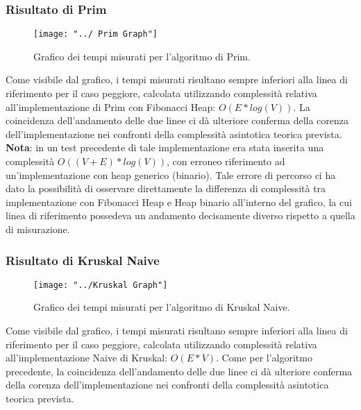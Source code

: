 \subsubsection{Risultato di Prim}
\begin{figure}[H]
	\centering
	\texttt{[image: "../ Prim Graph"]}
	\caption[]{Grafico dei tempi misurati per l'algoritmo di Prim.}
	\label{fig:prim-graph}
\end{figure}
Come visibile dal grafico, i tempi misurati risultano sempre inferiori alla linea di riferimento per il caso peggiore, calcolata utilizzando complessità relativa all'implementazione di Prim con Fibonacci Heap: $O(E*log(V))$. La coincidenza dell'andamento delle due linee ci dà ulteriore conferma della corenza dell'implementazione nei confronti della complessità asintotica teorica prevista. \\

\textbf{Nota}: in un test precedente di tale implementazione era stata inserita una complessità $O((V + E)*log(V))$, con erroneo riferimento ad un'implementazione con heap generico (binario). Tale errore di percorso ci ha dato la possibilità di osservare direttamente la differenza di complessità tra implementazione con Fibonacci Heap e Heap binario all'interno del grafico, la cui linea di riferimento possedeva un andamento decisamente diverso rispetto a quella di misurazione.

\subsubsection{Risultato di Kruskal Naive}
\begin{figure}[H]
	\centering
	\texttt{[image: "../Kruskal Graph"]}
	\caption{Grafico dei tempi misurati per l'algoritmo di Kruskal Naive.}
	\label{fig:kruskal-graph}
\end{figure}
Come visibile dal grafico, i tempi misurati risultano sempre inferiori alla linea di riferimento per il caso peggiore, calcolata utilizzando complessità relativa all'implementazione Naive di Kruskal: $O(E*V)$. Come per l'algoritmo precedente, la coincidenza dell'andamento delle due linee ci dà ulteriore conferma della corenza dell'implementazione nei confronti della complessità asintotica teorica prevista.

\pagebreak

